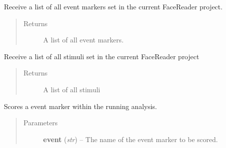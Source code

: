 \documentclass[letterpaper,10pt,english]{sphinxmanual}
\begin{document}
\begin{fulllineitems}
\begin{fulllineitems}
\end{fulllineitems}


\begin{fulllineitems}
\label{_static/code:FaceReader.FaceReader.get_events}
Receive a list of all event markers set in the current FaceReader project.
\begin{quote}\begin{description}
\item[{Returns}] \leavevmode
A list of all event markers.

\end{description}\end{quote}

\end{fulllineitems}


\begin{fulllineitems}
\label{_static/code:FaceReader.FaceReader.get_stimuli}
Receive a list of all stimuli set in the current FaceReader project
\begin{quote}\begin{description}
\item[{Returns}] \leavevmode
A list of all stimuli

\end{description}\end{quote}

\end{fulllineitems}


\begin{fulllineitems}
\label{_static/code:FaceReader.FaceReader.score_event}
Scores a event marker within the running analysis.
\begin{quote}\begin{description}
\item[{Parameters}] \leavevmode
\textbf{event} (\emph{str}) -- The name of the event marker to be scored.

\end{description}\end{quote}


\end{fulllineitems}
\end{fulllineitems}
\end{document}
